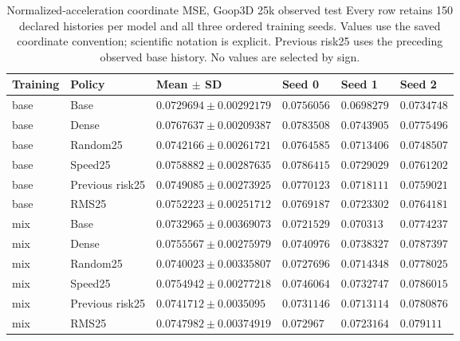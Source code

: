 \begin{table}[p]
\centering\scriptsize
\caption{Normalized-acceleration coordinate MSE, Goop3D 25k observed test Every row retains 150 declared histories per model and all three ordered training seeds. Values use the saved coordinate convention; scientific notation is explicit. Previous risk25 uses the preceding observed base history. No values are selected by sign.}
\label{tab:goop3d25k-observed-normalized-test}
\setlength{\tabcolsep}{3pt}
\begin{tabular}{llllll}
\toprule
Training & Policy & Mean $\pm$ SD & Seed 0 & Seed 1 & Seed 2\\
\midrule
base & Base & $0.0729694\pm0.00292179$ & $0.0756056$ & $0.0698279$ & $0.0734748$\\
base & Dense & $0.0767637\pm0.00209387$ & $0.0783508$ & $0.0743905$ & $0.0775496$\\
base & Random25 & $0.0742166\pm0.00261721$ & $0.0764585$ & $0.0713406$ & $0.0748507$\\
base & Speed25 & $0.0758882\pm0.00287635$ & $0.0786415$ & $0.0729029$ & $0.0761202$\\
base & Previous risk25 & $0.0749085\pm0.00273925$ & $0.0770123$ & $0.0718111$ & $0.0759021$\\
base & RMS25 & $0.0752223\pm0.00251712$ & $0.0769187$ & $0.0723302$ & $0.0764181$\\
mix & Base & $0.0732965\pm0.00369073$ & $0.0721529$ & $0.070313$ & $0.0774237$\\
mix & Dense & $0.0755567\pm0.00275979$ & $0.0740976$ & $0.0738327$ & $0.0787397$\\
mix & Random25 & $0.0740023\pm0.00335807$ & $0.0727696$ & $0.0714348$ & $0.0778025$\\
mix & Speed25 & $0.0754942\pm0.00277218$ & $0.0746064$ & $0.0732747$ & $0.0786015$\\
mix & Previous risk25 & $0.0741712\pm0.0035095$ & $0.0731146$ & $0.0713114$ & $0.0780876$\\
mix & RMS25 & $0.0747982\pm0.00374919$ & $0.072967$ & $0.0723164$ & $0.079111$\\
\bottomrule
\end{tabular}
\end{table}
